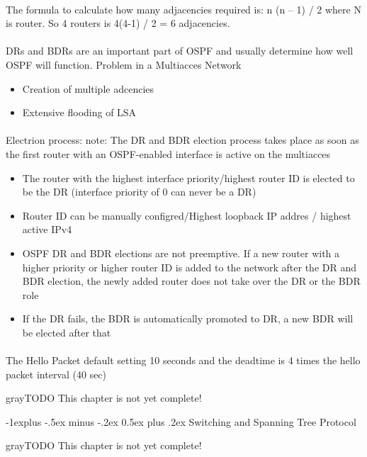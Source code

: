 \documentclass[10pt,landscape]{article}
\makeatletter
\renewcommand{\subsection}{\@startsection{subsection}{2}{0mm}%
                                {-1explus -.5ex minus -.2ex}%
                                {0.5ex plus .2ex}%
                                {\normalfont\normalsize\bfseries}}
\makeatother
\begin{document}
\begin{multicols}{3}
\paragraph{}
The formula to calculate how many adjacencies required is: n (n – 1) / 2  where N is router. So 4 routers is 4(4-1) / 2 = 6 adjacencies. 
\paragraph{}
DRs and BDRs are an important part of OSPF and usually determine how well OSPF will function. Problem in a Multiacces Network 
\begin{itemize}
	\item Creation of multiple adcencies
	\item Extensive flooding of LSA
\end{itemize}
\paragraph{}
Electrion process:
note: The DR and BDR election process takes place as soon as the first router with an OSPF-enabled interface is active on the multiacces
\begin{itemize}
	\item The router with the highest interface priority/highest router ID is elected to be the DR (interface priority of 0 can never be a DR)
	\item Router ID can be manually configred/Highest loopback IP addres / highest active IPv4 
	\item OSPF DR and BDR elections are not preemptive. If a new router with a higher priority or higher router ID is added to the network after the DR and BDR election, the newly added router does not take over the DR or the BDR role
	\item If the DR fails, the BDR is automatically promoted to DR, a new BDR will be elected after that
\end{itemize}
\paragraph{}
The Hello Packet default setting 10 seconds and the deadtime is 4 times the hello packet interval (40 sec)
\begin{textbox}{gray}{TODO}
	This chapter is not yet complete!
\end{textbox}

\subsection{Switching and Spanning Tree Protocol}
\begin{textbox}{gray}{TODO}
	This chapter is not yet complete!
\end{textbox}


\end{multicols}
\end{document}
